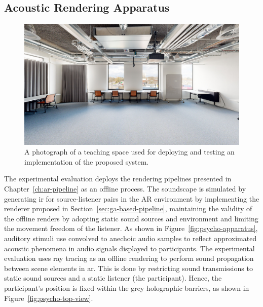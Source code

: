 \subsection{Acoustic Rendering Apparatus}
\begin{figure}[htbp]
    \centering
    \includegraphics[width=1\linewidth]{7_evaluation/images/CST-208-2.png}
    \caption{A photograph of a teaching space used for deploying and testing an implementation of the proposed system.}
    \label{fig:cst-208-photograph}
\end{figure}
The experimental evaluation deploys the rendering pipelines presented in Chapter~\ref{ch:ar-pipeline} as an offline process. The soundscape is simulated by generating \acrshort{ir} for source-listener pairs in the AR environment by implementing the renderer proposed in Section~\ref{sec:ga-based-pipeline}, maintaining the validity of the offline renders by adopting static sound sources and environment and limiting the movement freedom of the listener. As shown in Figure~\ref{fig:psycho-apparatus}, auditory stimuli use  convolved to anechoic audio samples to reflect approximated acoustic phenomena in audio signals displayed to participants. The experimental evaluation uses ray tracing as an offline rendering to perform sound propagation between scene elements in \acrshort{ar}. This is done by restricting sound transmissions to static sound sources and a static listener (the participant). Hence, the participant's position is fixed within the grey holographic barriers, as shown in Figure~\ref{fig:psycho-top-view}.

